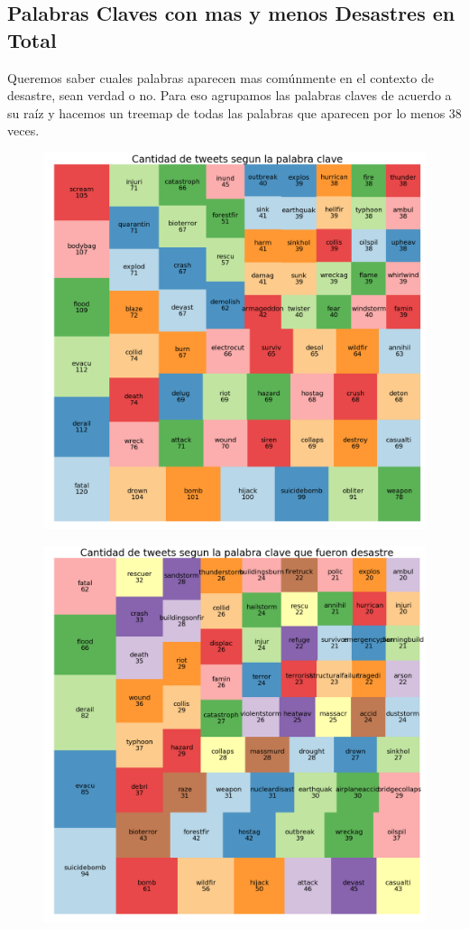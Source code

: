 \documentclass[titlepage,a4paper]{article}
\begin{document}
\subsection{\Large Palabras Claves con mas y menos Desastres en Total }
{\Large
Queremos saber cuales palabras aparecen mas comúnmente en el contexto de desastre, sean verdad o no. Para eso agrupamos las palabras claves de acuerdo a su raíz y hacemos un treemap de todas las palabras que aparecen por lo menos 38 veces.
\par}
{\Large
\begin{figure}[H]
 \centering
 \includegraphics[width=1\textwidth, height=1\textheight, keepaspectratio]{graficos/cantidad_tweets_palabra_clave_0.png}
\end{figure}
\begin{figure}[H]
 \centering
 \includegraphics[width=1\textwidth, height=1\textheight, keepaspectratio]{graficos/cantidad_tweets_palabra_clave_1.png}

\end{figure}}
\end{document}
